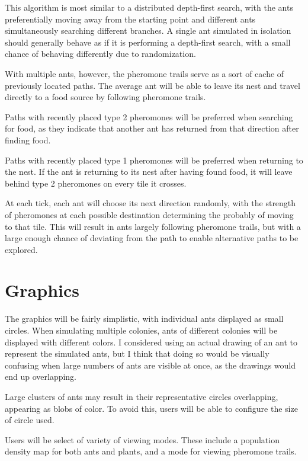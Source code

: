 \documentclass[journal]{IEEEtran}
\begin{document}
This algorithm is most similar to a distributed depth-first search, with the ants preferentially moving away from the starting point and different ants simultaneously searching different branches.  A single ant simulated in isolation should generally behave as if it is performing a depth-first search, with a small chance of behaving differently due to randomization.

With multiple ants, however, the pheromone trails serve as a sort of cache of previously located paths.  The average ant will be able to leave its nest and travel directly to a food source by following pheromone trails. 

Paths with recently placed type 2 pheromones will be preferred when searching for food, as they indicate that another ant has returned from that direction after finding food.

Paths with recently placed type 1 pheromones will be preferred when returning to the nest.  If the ant is returning to its nest after having found food, it will leave behind type 2 pheromones on every tile it crosses.

At each tick, each ant will choose its next direction randomly, with the strength of pheromones at each possible destination determining the probably of moving to that tile.  This will result in ants largely following pheromone trails, but with a large enough chance of deviating from the path to enable alternative paths to be explored.

\section{Graphics}

The graphics will be fairly simplistic, with individual ants displayed as small circles.  When simulating multiple colonies, ants of different colonies will be displayed with different colors.
I considered using an actual drawing of an ant to represent the simulated ants, but I think that doing so would be visually confusing when large numbers of ants are visible at once, as the drawings would end up overlapping.

Large clusters of ants may result in their representative circles overlapping, appearing as blobs of color.  To avoid this, users will be able to configure the size of circle used.

Users will be select of variety of viewing modes.  These include a population density map for both ants and plants, and a mode for viewing pheromone trails.
\end{document}
